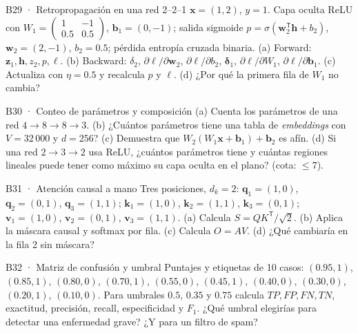 \begin{ejercicio}{B29 · Retropropagación en una red 2–2–1 }
$\mathbf x=(1,2)$, $y=1$. Capa oculta ReLU con $W_1=\begin{pmatrix}1&-1\\0.5&0.5\end{pmatrix}$, $\mathbf b_1=(0,-1)$;
salida sigmoide $p=\sigma(\mathbf w_2^\mathsf T\mathbf h+b_2)$, $\mathbf w_2=(2,-1)$, $b_2=0.5$; pérdida entropía cruzada binaria.
(a) Forward: $\mathbf z_1,\mathbf h,z_2,p,\ell$. (b) Backward: $\delta_2$, $\partial\ell/\partial\mathbf w_2$, $\partial\ell/\partial b_2$, $\boldsymbol\delta_1$,
$\partial\ell/\partial W_1$, $\partial\ell/\partial\mathbf b_1$. (c) Actualiza con $\eta=0.5$ y recalcula $p$ y $\ell$.
(d) ¿Por qué la primera fila de $W_1$ no cambia?
\end{ejercicio}

\begin{ejercicio}{B30 · Conteo de parámetros y composición }
(a) Cuenta los parámetros de una red $4\to8\to8\to3$. (b) ¿Cuántos parámetros tiene una tabla de \emph{embeddings} con
$V=32\,000$ y $d=256$? (c) Demuestra que $W_2(W_1\mathbf x+\mathbf b_1)+\mathbf b_2$ es afín. (d) Si una red $2\to3\to2$ usa ReLU,
¿cuántos parámetros tiene y cuántas regiones lineales puede tener como máximo su capa oculta en el plano? (cota: $\le 7$).
\end{ejercicio}

\begin{ejercicio}{B31 · Atención causal a mano }
Tres posiciones, $d_k=2$: $\mathbf q_1=(1,0)$, $\mathbf q_2=(0,1)$, $\mathbf q_3=(1,1)$; $\mathbf k_1=(1,0)$, $\mathbf k_2=(1,1)$, $\mathbf k_3=(0,1)$;
$\mathbf v_1=(1,0)$, $\mathbf v_2=(0,1)$, $\mathbf v_3=(1,1)$.
(a) Calcula $S=QK^\mathsf T/\sqrt2$. (b) Aplica la máscara causal y softmax por fila. (c) Calcula $O=AV$.
(d) ¿Qué cambiaría en la fila 2 sin máscara?
\end{ejercicio}

\begin{ejercicio}{B32 · Matriz de confusión y umbral }
Puntajes y etiquetas de 10 casos: $(0.95,1)$, $(0.85,1)$, $(0.80,0)$, $(0.70,1)$, $(0.55,0)$, $(0.45,1)$, $(0.40,0)$, $(0.30,0)$, $(0.20,1)$, $(0.10,0)$.
Para umbrales $0.5$, $0.35$ y $0.75$ calcula $TP,FP,FN,TN$, exactitud, precisión, recall, especificidad y $F_1$.
¿Qué umbral elegirías para detectar una enfermedad grave? ¿Y para un filtro de spam?
\end{ejercicio}

